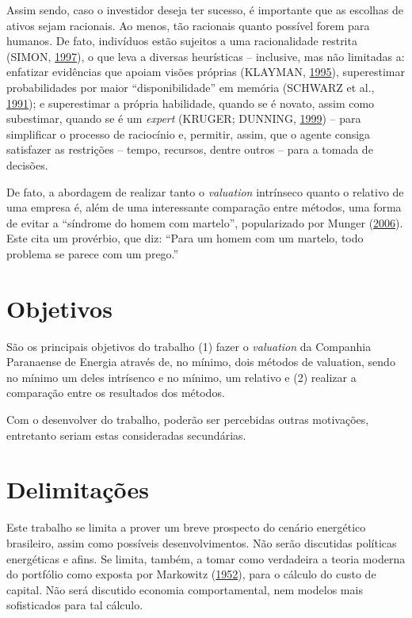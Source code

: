 \documentclass[aprovado,numbers]{coppe}
\begin{document}
  Assim sendo, caso o investidor deseja ter sucesso, é importante que as escolhas de ativos sejam racionais. Ao menos, tão racionais quanto possível forem para humanos. De fato, indivíduos estão sujeitos a uma racionalidade restrita (SIMON, \protect\hyperlink{ref-simon1997}{1997}), o que leva a diversas heurísticas -- inclusive, mas não limitadas a: enfatizar evidências que apoiam visões próprias (KLAYMAN, \protect\hyperlink{ref-klayman1995}{1995}), superestimar probabilidades por maior ``disponibilidade'' em memória (SCHWARZ et al., \protect\hyperlink{ref-schwarz1991}{1991}); e superestimar a própria habilidade, quando se é novato, assim como subestimar, quando se é um \emph{expert} (KRUGER; DUNNING, \protect\hyperlink{ref-kruger1999}{1999}) -- para simplificar o processo de raciocínio e, permitir, assim, que o agente consiga satisfazer as restrições -- tempo, recursos, dentre outros -- para a tomada de decisões.

  De fato, a abordagem de realizar tanto o \emph{valuation} intrínseco quanto o relativo de uma empresa é, além de uma interessante comparação entre métodos, uma forma de evitar a ``síndrome do homem com martelo'', popularizado por Munger (\protect\hyperlink{ref-munger2006}{2006}). Este cita um provérbio, que diz: ``Para um homem com um martelo, todo problema se parece com um prego.''

  \hypertarget{objetivos}{%
  \section{Objetivos}\label{objetivos}}

  São os principais objetivos do trabalho (1) fazer o \emph{valuation} da Companhia Paranaense de Energia através de, no mínimo, dois métodos de valuation, sendo no mínimo um deles intrísenco e no mínimo, um relativo e (2) realizar a comparação entre os resultados dos métodos.

  Com o desenvolver do trabalho, poderão ser percebidas outras motivações, entretanto seriam estas consideradas secundárias.

  \hypertarget{delimitauxe7uxf5es}{%
  \section{Delimitações}\label{delimitauxe7uxf5es}}

  Este trabalho se limita a prover um breve prospecto do cenário energético brasileiro, assim como possíveis desenvolvimentos. Não serão discutidas políticas energéticas e afins. Se limita, também, a tomar como verdadeira a teoria moderna do portfólio como exposta por Markowitz (\protect\hyperlink{ref-markowitz1952}{1952}), para o cálculo do custo de capital. Não será discutido economia comportamental, nem modelos mais sofisticados para tal cálculo.
\end{document}
